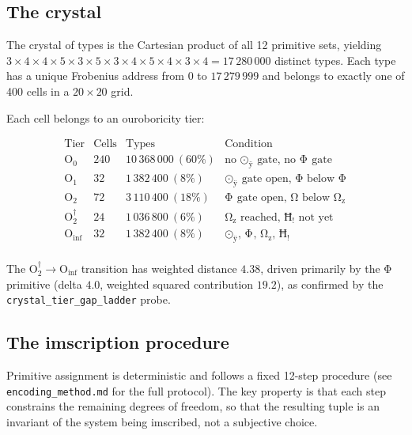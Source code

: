 \documentclass[11pt,a4paper]{article}
\theoremstyle{definition}
\begin{document}
\subsection{The crystal}

The crystal of types is the Cartesian product of all 12 primitive sets,
yielding $3 \times 4 \times 4 \times 5 \times 3 \times 5 \times 3 \times 4
\times 5 \times 4 \times 3 \times 4 = 17\,280\,000$ distinct types.
Each type has a unique Frobenius address from $0$ to $17\,279\,999$ and
belongs to exactly one of 400 cells in a $20 \times 20$ grid.

Each cell belongs to an ouroboricity tier:

\[
\begin{array}{c|c|c|c}
\text{Tier} & \text{Cells} & \text{Types} & \text{Condition} \\ \hline
\text{O}_0 & 240 & 10\,368\,000\ (60\%) & \text{no $\text{⊙}_{\text{ÿ}}$ gate, no $\text{Φ}_{\text{}}$ gate} \\
\text{O}_1 & 32 & 1\,382\,400\ (8\%) & \text{$\text{⊙}_{\text{ÿ}}$ gate open, $\text{Φ}$ below $\text{Φ}_{\text{}}$} \\
\text{O}_2 & 72 & 3\,110\,400\ (18\%) & \text{$\text{Φ}_{\text{}}$ gate open, $\text{Ω}$ below $\text{Ω}_{\text{z}}$} \\
\text{O}_2^\dagger & 24 & 1\,036\,800\ (6\%) & \text{$\text{Ω}_{\text{z}}$ reached, $\text{Ħ}_{\text{!}}$ not yet} \\
\text{O}_{\text{inf}} & 32 & 1\,382\,400\ (8\%) & \text{$\text{⊙}_{\text{ÿ}}$, $\text{Φ}_{\text{}}$, $\text{Ω}_{\text{z}}$, $\text{Ħ}_{\text{!}}$} \\
\end{array}
\]

The $\text{O}_2^\dagger \to \text{O}_{\text{inf}}$ transition has weighted
distance $4.38$, driven primarily by the $\text{Φ}$ primitive (delta $4.0$,
weighted squared contribution $19.2$), as confirmed by the
\texttt{crystal\_tier\_gap\_ladder} probe.

\subsection{The imscription procedure}

Primitive assignment is deterministic and follows a fixed 12-step procedure
(see \texttt{encoding\_method.md} for the full protocol). The key property is
that each step constrains the remaining degrees of freedom, so that the
resulting tuple is an invariant of the system being imscribed, not
a subjective choice.
\end{document}
